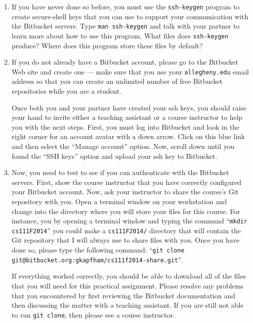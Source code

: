 \begin{enumerate}

  \item If you have never done so before, you must use the {\tt ssh-keygen} program to create secure-shell keys that you
    can use to support your communication with the Bitbucket servers.  Type {\tt man ssh-keygen} and talk with your
    partner to learn more about how to use this program.  What files does {\tt ssh-keygen} produce?  Where does this
    program store these files by default?

  \item If you do not already have a Bitbucket account, please go to the Bitbucket Web site and create one --- 
    make sure that you use your {\tt allegheny.edu} email address so that you can create an unlimited number of free
    Bitbucket repositories while you are a student. 
    
    Once both you and your partner have created your ssh keys, you should raise your hand to invite either a teaching
    assistant or a course instructor to help you with the next steps. First, you must log into Bitbucket and look in
    the right corner for an account avatar with a down arrow.  Click on this blue link and then select the ``Manage
    account'' option. Now, scroll down until you found the ``SSH keys'' option and upload your ssh key to Bitbucket.

  \item Now, you need to test to see if you can authenticate with the Bitbucket servers.  First, show the course
    instructor that you have correctly configured your Bitbucket account.  Now, ask your instructor to share the
    course's Git repository with you.  Open a terminal window on your workstation and change into the directory where
    you will store your files for this course.  For instance, you by opening a terminal window and typing the command
    ``{\tt mkdir cs111F2014}'' you could make a {\tt cs111F2014/} directory that will contain the Git repository that I
    will always use to share files with you.  Once you have done so, please type the following command: ``{\tt git clone
      git@bitbucket.org:gkapfham/cs111f2014-share.git}''.  
    
    If everything worked correctly, you should be able to download all of the files that you will need for this
    practical assignment. Please resolve any problems that you encountered by first reviewing the Bitbucket
    documentation and then discussing the matter with a teaching assistant.  If you are still not able to run {\tt git
      clone}, then please see a course instructor.


\end{enumerate}
